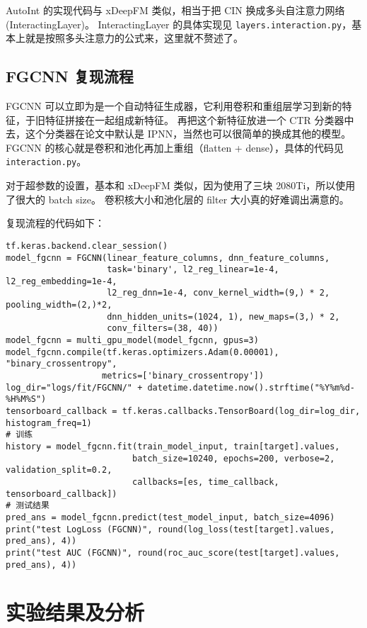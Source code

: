 \documentclass[degree=master,cjk-font=noto]{thuthesis}
\begin{document}
AutoInt 的实现代码与 xDeepFM 类似，相当于把 CIN 换成多头自注意力网络(InteractingLayer)。
InteractingLayer 的具体实现见 \texttt{layers.interaction.py}，基本上就是按照多头注意力的公式来，这里就不赘述了。

\section{FGCNN 复现流程}
\label{sec:fgcnn_reproduce}

FGCNN 可以立即为是一个自动特征生成器，它利用卷积和重组层学习到新的特征，于旧特征拼接在一起组成新特征。
再把这个新特征放进一个 CTR 分类器中去，这个分类器在论文中默认是 IPNN，当然也可以很简单的换成其他的模型。
FGCNN 的核心就是卷积和池化再加上重组（flatten + dense），具体的代码见 \texttt{interaction.py}。

对于超参数的设置，基本和 xDeepFM 类似，因为使用了三块 2080Ti，所以使用了很大的 batch size。
卷积核大小和池化层的 filter 大小真的好难调出满意的。

复现流程的代码如下：

  \begin{verbatim}
tf.keras.backend.clear_session()
model_fgcnn = FGCNN(linear_feature_columns, dnn_feature_columns,
                    task='binary', l2_reg_linear=1e-4, l2_reg_embedding=1e-4,
                    l2_reg_dnn=1e-4, conv_kernel_width=(9,) * 2, pooling_width=(2,)*2,
                    dnn_hidden_units=(1024, 1), new_maps=(3,) * 2,
                    conv_filters=(38, 40))
model_fgcnn = multi_gpu_model(model_fgcnn, gpus=3)
model_fgcnn.compile(tf.keras.optimizers.Adam(0.00001), "binary_crossentropy",
                   metrics=['binary_crossentropy'])
log_dir="logs/fit/FGCNN/" + datetime.datetime.now().strftime("%Y%m%d-%H%M%S")
tensorboard_callback = tf.keras.callbacks.TensorBoard(log_dir=log_dir, histogram_freq=1)
# 训练
history = model_fgcnn.fit(train_model_input, train[target].values,
                         batch_size=10240, epochs=200, verbose=2, validation_split=0.2,
                         callbacks=[es, time_callback, tensorboard_callback])
# 测试结果
pred_ans = model_fgcnn.predict(test_model_input, batch_size=4096)
print("test LogLoss (FGCNN)", round(log_loss(test[target].values, pred_ans), 4))
print("test AUC (FGCNN)", round(roc_auc_score(test[target].values, pred_ans), 4))
  \end{verbatim}

\chapter{实验结果及分析}
\label{chap:result}
\end{document}
